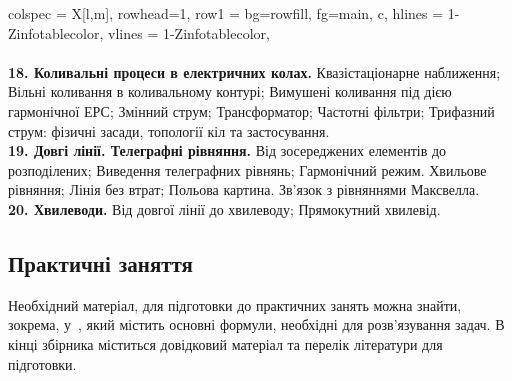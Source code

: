 \documentclass{Syllabus}
\begin{document}
\begin{longtblr}[
	]{
	colspec = {X[l,m]},
    rowhead=1,
	row{1} = {bg=rowfill, fg=main,  c},
	hlines = {1-Z}{infotablecolor},
	vlines = {1-Z}{infotablecolor},
	}
    \\
    \\
	\textbf{18. Коливальні процеси в електричних колах.}\newline
    Квазістаціонарне наближення; Вільні коливання в коливальному контурі; Вимушені коливання під дією гармонічної ЕРС; Змінний струм; Трансформатор; Частотні фільтри; Трифазний струм: фізичні засади, топології кіл та застосування.
    \\
	\textbf{19. Довгі лінії. Телеграфні рівняння.}\newline
    Від зосереджених елементів до розподілених; Виведення телеграфних рівнянь; Гармонічний режим. Хвильове рівняння; Лінія без втрат; Польова картина. Зв’язок з рівняннями Максвелла.
    \\
	\textbf{20. Хвилеводи.}\newline
    Від довгої лінії до хвилеводу; Прямокутний хвилевід.
    \\
\end{longtblr}

\subsection*{Практичні заняття}

Необхідний матеріал, для підготовки до практичних занять можна знайти, зокрема, у~\cite{Ponomarenko}, який містить основні формули, необхідні для розв'язування задач. В кінці збірника міститься довідковий матеріал та перелік літератури для підготовки.
\end{document}
